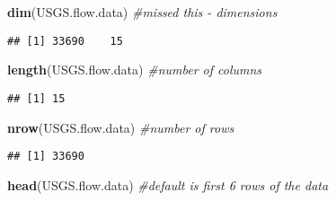 \documentclass[]{article}
\newenvironment{Shaded}{\begin{snugshade}}{\end{snugshade}}
\newcommand{\CommentTok}[1]{\textcolor[rgb]{0.56,0.35,0.01}{\textit{#1}}}
\newcommand{\KeywordTok}[1]{\textcolor[rgb]{0.13,0.29,0.53}{\textbf{#1}}}
\newcommand{\NormalTok}[1]{#1}
\begin{document}
\begin{Shaded}
\begin{Highlighting}[]
\KeywordTok{dim}\NormalTok{(USGS.flow.data) }\CommentTok{#missed this - dimensions  }
\end{Highlighting}
\end{Shaded}

\begin{verbatim}
## [1] 33690    15
\end{verbatim}

\begin{Shaded}
\begin{Highlighting}[]
\KeywordTok{length}\NormalTok{(USGS.flow.data) }\CommentTok{#number of columns }
\end{Highlighting}
\end{Shaded}

\begin{verbatim}
## [1] 15
\end{verbatim}

\begin{Shaded}
\begin{Highlighting}[]
\KeywordTok{nrow}\NormalTok{(USGS.flow.data) }\CommentTok{#number of rows }
\end{Highlighting}
\end{Shaded}

\begin{verbatim}
## [1] 33690
\end{verbatim}

\begin{Shaded}
\begin{Highlighting}[]
\KeywordTok{head}\NormalTok{(USGS.flow.data) }\CommentTok{#default is first 6 rows of the data}
\end{Highlighting}
\end{Shaded}
\end{document}
